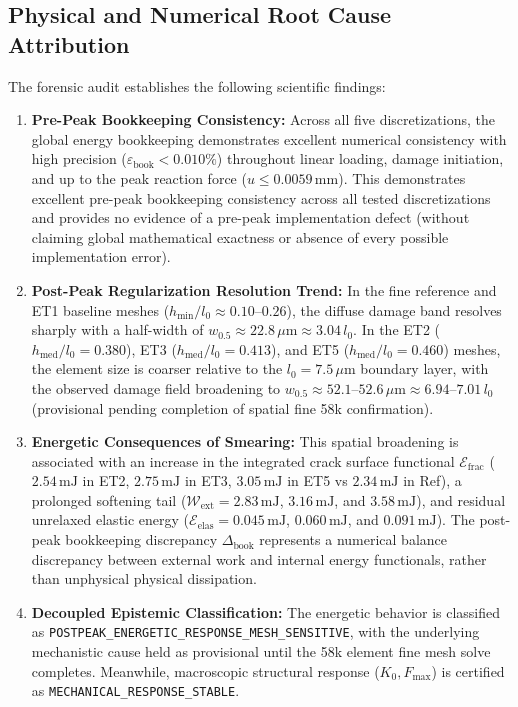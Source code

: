 \subsection{Physical and Numerical Root Cause Attribution}
The forensic audit establishes the following scientific findings:
\begin{enumerate}
  \item \textbf{Pre-Peak Bookkeeping Consistency:} Across all five discretizations, the global energy bookkeeping demonstrates excellent numerical consistency with high precision ($\varepsilon_{\mathrm{book}} < 0.010\%$) throughout linear loading, damage initiation, and up to the peak reaction force ($u \le 0.0059\,\mathrm{mm}$). This demonstrates excellent pre-peak bookkeeping consistency across all tested discretizations and provides no evidence of a pre-peak implementation defect (without claiming global mathematical exactness or absence of every possible implementation error).
  \item \textbf{Post-Peak Regularization Resolution Trend:} In the fine reference and ET1 baseline meshes ($h_{\min}/l_0 \approx 0.10\text{--}0.26$), the diffuse damage band resolves sharply with a half-width of $w_{0.5} \approx 22.8\,\mu\mathrm{m} \approx 3.04\,l_0$. In the ET2 ($h_{\mathrm{med}}/l_0 = 0.380$), ET3 ($h_{\mathrm{med}}/l_0 = 0.413$), and ET5 ($h_{\mathrm{med}}/l_0 = 0.460$) meshes, the element size is coarser relative to the $l_0 = 7.5\,\mu\mathrm{m}$ boundary layer, with the observed damage field broadening to $w_{0.5} \approx 52.1\text{--}52.6\,\mu\mathrm{m} \approx 6.94\text{--}7.01\,l_0$ (provisional pending completion of spatial fine 58k confirmation).
  \item \textbf{Energetic Consequences of Smearing:} This spatial broadening is associated with an increase in the integrated crack surface functional $\mathcal{E}_{\mathrm{frac}}$ ($2.54\,\mathrm{mJ}$ in ET2, $2.75\,\mathrm{mJ}$ in ET3, $3.05\,\mathrm{mJ}$ in ET5 vs $2.34\,\mathrm{mJ}$ in Ref), a prolonged softening tail ($\mathcal{W}_{\mathrm{ext}} = 2.83\,\mathrm{mJ}$, $3.16\,\mathrm{mJ}$, and $3.58\,\mathrm{mJ}$), and residual unrelaxed elastic energy ($\mathcal{E}_{\mathrm{elas}} = 0.045\,\mathrm{mJ}$, $0.060\,\mathrm{mJ}$, and $0.091\,\mathrm{mJ}$). The post-peak bookkeeping discrepancy $\Delta_{\mathrm{book}}$ represents a numerical balance discrepancy between external work and internal energy functionals, rather than unphysical physical dissipation.
  \item \textbf{Decoupled Epistemic Classification:} The energetic behavior is classified as \texttt{POSTPEAK\_}\allowbreak\texttt{ENERGETIC\_}\allowbreak\texttt{RESPONSE\_}\allowbreak\texttt{MESH\_}\allowbreak\texttt{SENSITIVE}, with the underlying mechanistic cause held as provisional until the 58k element fine mesh solve completes. Meanwhile, macroscopic structural response ($K_0, F_{\max}$) is certified as \texttt{MECHANICAL\_}\allowbreak\texttt{RESPONSE\_}\allowbreak\texttt{STABLE}.
\end{enumerate}

